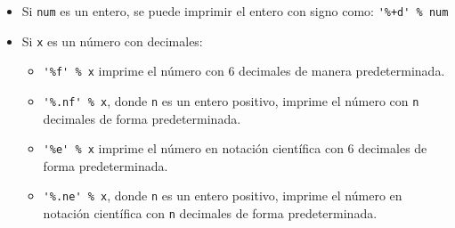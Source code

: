 \documentclass[12pt]{article}
\theoremstyle{definition}
\begin{document}
\begin{itemize}
  \item Si \verb|num| es un entero, se puede imprimir el entero con signo como: \verb|'%+d' % num|
  \item Si \verb|x| es un n\'umero con decimales:
    \begin{itemize}
      \item \verb|'%f' % x| imprime el n\'umero con 6 decimales de manera predeterminada.
      \item \verb|'%.nf' % x|, donde \verb|n| es un entero positivo, imprime el n\'umero con \verb|n| decimales de forma predeterminada.
      \item \verb|'%e' % x| imprime el n\'umero en notaci\'on cient\'ifica con 6 decimales de forma predeterminada.
      \item \verb|'%.ne' % x|, donde \verb|n| es un entero positivo, imprime el n\'umero en notaci\'on cient\'ifica con \verb|n| decimales de forma predeterminada.
    \end{itemize}
\end{itemize}
\end{document}
